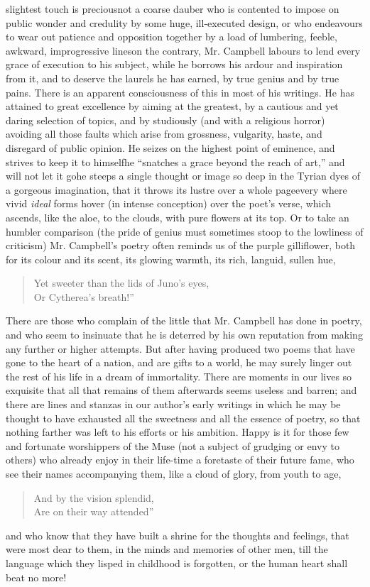 slightest touch is precious\textemdash not a coarse dauber who is contented to
impose on public wonder and credulity by some huge, ill-executed design,
or who endeavours to wear out patience and opposition together by a load
of lumbering, feeble, awkward, improgressive lines\textemdash on the contrary, Mr.
Campbell labours to lend every grace of execution to his subject, while
he borrows his ardour and inspiration from it, and to deserve the
laurels he has earned, by true genius and by true pains. There is an
apparent consciousness of this in most of his writings. He has attained
to great excellence by aiming at the greatest, by a cautious and yet
daring selection of topics, and by studiously (and with a religious
horror) avoiding all those faults which arise from grossness, vulgarity,
haste, and disregard of public opinion. He seizes on the highest point
of eminence, and strives to keep it to himself\textemdash he ``snatches a grace
beyond the reach of art,'' and will not let it go\textemdash he steeps a single
thought or image so deep in the Tyrian dyes of a gorgeous imagination,
that it throws its lustre over a whole page\textemdash every where vivid \emph{ideal}
forms hover (in intense conception) over the poet's verse, which
ascends, like the aloe, to the clouds, with pure flowers at its top. Or
to take an humbler comparison (the pride of genius must sometimes stoop
to the lowliness of criticism) Mr. Campbell's poetry often reminds us of
the purple gilliflower, both for its colour and its scent, its glowing
warmth, its rich, languid, sullen hue,
\begin{verse}
  Yet sweeter than the lids of Juno's eyes, \\
  Or Cytherea's breath!''
\end{verse}
There are those who complain of the little that Mr. Campbell has done
in poetry, and who seem to insinuate that he is deterred by his own
reputation from making any further or higher attempts. But after having
produced two poems that have gone to the heart of a nation, and are
gifts to a world, he may surely linger out the rest of his life in a
dream of immortality. There are moments in our lives so exquisite that
all that remains of them afterwards seems useless and barren; and there
are lines and stanzas in our author's early writings in which he may
be thought to have exhausted all the sweetness and all the essence of
poetry, so that nothing farther was left to his efforts or his ambition.
Happy is it for those few and fortunate worshippers of the Muse (not
a subject of grudging or envy to others) who already enjoy in their
life-time a foretaste of their future fame, who see their names
accompanying them, like a cloud of glory, from youth to age,
\begin{verse}
  And by the vision splendid,\\
  Are on their way attended''\textemdash 
\end{verse}
and who know that they have built a shrine for the thoughts and
feelings, that were most dear to them, in the minds and memories
of other men, till the language which they lisped in childhood is
forgotten, or the human heart shall beat no more!

